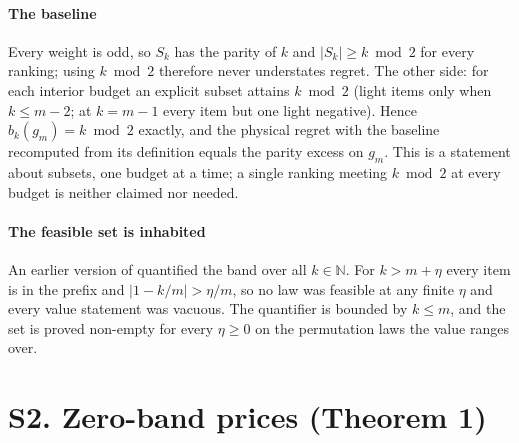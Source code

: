 
\paragraph{The baseline} Every weight is odd, so $S_{k}$ has the parity of $k$ and
$|S_{k}|\ge k\bmod2$ for every ranking; using $k\bmod2$ therefore never understates regret.
The other side: for each interior budget an explicit subset attains $k\bmod2$ (light items
only when $k\le m-2$; at $k=m-1$ every item but one light negative). Hence
$b_{k}(g_{m})=k\bmod2$ exactly, and the physical regret with the baseline recomputed from
its definition equals the parity excess on $g_{m}$. This is a statement about subsets, one
budget at a time; a single ranking meeting $k\bmod2$ at every budget is neither claimed nor
needed.


\paragraph{The feasible set is inhabited} An earlier version of 
quantified the band over all $k\in\mathbb{N}$. For $k>m+\eta$ every item is in the
prefix and $|1-k/m|>\eta/m$, so no law was feasible at any finite $\eta$ and every value
statement was vacuous. The quantifier
is bounded by $k\le m$, and the set is proved non-empty for every $\eta\ge0$ on the
permutation laws the value ranges over.


\section{S2. Zero-band prices (Theorem 1)}

